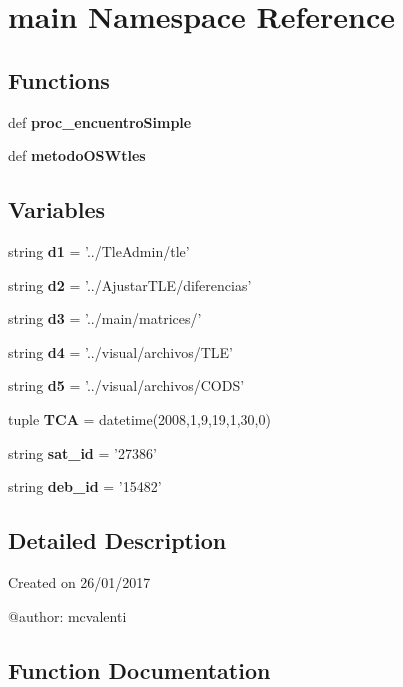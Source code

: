 \section{main \-Namespace \-Reference}
\label{namespacemain}
\subsection*{\-Functions}
\begin{DoxyCompactItemize}
\item 
def {\bf proc\-\_\-encuentro\-Simple}
\item 
def {\bf metodo\-O\-S\-Wtles}
\end{DoxyCompactItemize}
\subsection*{\-Variables}
\begin{DoxyCompactItemize}
\item 
string {\bf d1} = '../\-Tle\-Admin/tle'
\item 
string {\bf d2} = '../\-Ajustar\-T\-L\-E/diferencias'
\item 
string {\bf d3} = '../main/matrices/'
\item 
string {\bf d4} = '../visual/archivos/\-T\-L\-E'
\item 
string {\bf d5} = '../visual/archivos/\-C\-O\-D\-S'
\item 
tuple {\bf \-T\-C\-A} = datetime(2008,1,9,19,1,30,0)
\item 
string {\bf sat\-\_\-id} = '27386'
\item 
string {\bf deb\-\_\-id} = '15482'
\end{DoxyCompactItemize}


\subsection{\-Detailed \-Description}
\begin{DoxyVerb}
Created on 26/01/2017

@author: mcvalenti
\end{DoxyVerb}
 

\subsection{\-Function \-Documentation}
